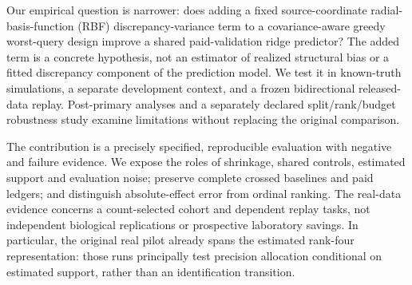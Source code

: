 Our empirical question is narrower: does adding a fixed source-coordinate radial-basis-function (RBF) discrepancy-variance term to a covariance-aware greedy worst-query design improve a shared paid-validation ridge predictor? The added term is a concrete hypothesis, not an estimator of realized structural bias or a fitted discrepancy component of the prediction model. We test it in known-truth simulations, a separate development context, and a frozen bidirectional released-data replay. Post-primary analyses and a separately declared split/rank/budget robustness study examine limitations without replacing the original comparison.

The contribution is a precisely specified, reproducible evaluation with negative and failure evidence. We expose the roles of shrinkage, shared controls, estimated support and evaluation noise; preserve complete crossed baselines and paid ledgers; and distinguish absolute-effect error from ordinal ranking. The real-data evidence concerns a count-selected cohort and dependent replay tasks, not independent biological replications or prospective laboratory savings. In particular, the original real pilot already spans the estimated rank-four representation: those runs principally test precision allocation conditional on estimated support, rather than an identification transition.
